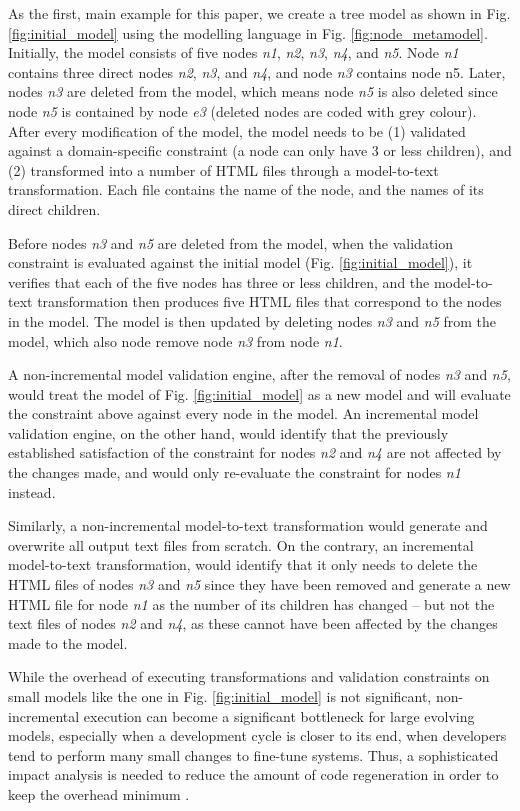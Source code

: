 \documentclass{llncs}
\begin{document}
As the first, main example for this paper, we create a tree model as shown in Fig. \ref{fig:initial_model} using the modelling language in Fig. \ref{fig:node_metamodel}. Initially, the model consists of five nodes \emph{n1}, \emph{n2}, \emph{n3}, \emph{n4}, and \emph{n5}. Node \emph{n1} contains three direct nodes \emph{n2}, \emph{n3}, and \emph{n4}, and node \emph{n3} contains node {n5}. Later, nodes \emph{n3} are deleted from the model, which means node \emph{n5} is also deleted since node \emph{n5} is contained by node \emph{e3} (deleted nodes are coded with grey colour). After every modification of the model, the model needs to be (1) validated against a domain-specific constraint (a node can only have 3 or less children), and (2) transformed into a number of HTML files through a model-to-text transformation. Each file contains the name of the node, and the names of its direct children.

Before nodes \emph{n3} and \emph{n5} are deleted from the model, when the validation constraint is evaluated against the initial model (Fig. \ref{fig:initial_model}), it verifies that each of the five nodes has three or less children, and the model-to-text transformation then produces five HTML files that correspond to the nodes in the model. The model is then updated by deleting nodes \emph{n3} and \emph{n5} from the model, which also node remove node \emph{n3} from node \emph{n1}. 

A non-incremental model validation engine, after the removal of nodes \emph{n3} and \emph{n5}, would treat the model of Fig. \ref{fig:initial_model} as a new model and will evaluate the constraint above against every node in the model. An incremental model validation engine, on the other hand, would identify that the previously established satisfaction of the constraint for nodes \emph{n2} and \emph{n4} are not affected by the changes made, and would only re-evaluate the constraint for nodes \emph{n1} instead. 

Similarly, a non-incremental model-to-text transformation would generate and overwrite all output text files from scratch. On the contrary, an incremental model-to-text transformation, would identify that it only needs to delete the HTML files of nodes \emph{n3} and \emph{n5} since they have been removed and generate a new HTML file for node \emph{n1} as the number of its children has changed -- but not the text files of nodes \emph{n2} and \emph{n4}, as these cannot have been affected by the changes made to the model.

While the overhead of executing transformations and validation constraints on small models like the one in Fig. \ref{fig:initial_model} is not significant, non-incremental execution can become a significant bottleneck for large evolving models, especially when a development cycle is closer to its end, when developers tend to perform many small changes to fine-tune systems. Thus, a sophisticated impact analysis is needed to reduce the amount of code regeneration in order to keep the overhead minimum \cite{selic2003pragmatics}.  
\end{document}
